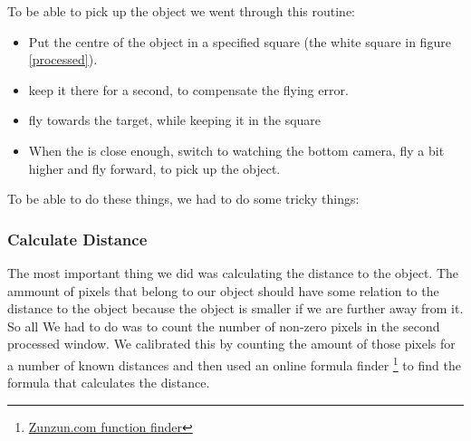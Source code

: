 To be able to pick up the object we went through this routine:
\begin{itemize}
\item Put the centre of the object in a specified square (the white square in figure \ref{processed}). 
\item keep it there for a second, to compensate the flying error.
\item fly towards the target, while keeping it in the square
\item When the \Ardrone is close enough, switch to watching the bottom camera, fly a bit higher and fly forward, to pick up the object.
\end{itemize}
To be able to do these things, we had to do some tricky things:

\subsubsection{Calculate Distance}
The most important thing we did was calculating the distance to the object. The ammount of pixels that belong to our 
object should have some relation to the distance to the object because the object is smaller if we are further away
from it. So all We had to do was to count the number of non-zero pixels in the second processed
window. 
We calibrated this by counting the amount of those pixels for a number of known distances and
then used an online formula finder \footnote{\href{http://zunzun.com/FunctionFinder/2/}{Zunzun.com function finder}} to find the formula 
that calculates the distance. %

